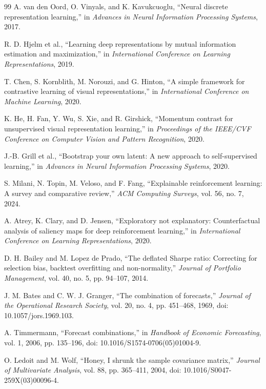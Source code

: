 \documentclass[11pt,a4paper]{article}
\begin{document}
\begin{thebibliography}{99}
A. van den Oord, O. Vinyals, and K. Kavukcuoglu,
``Neural discrete representation learning,'' in \emph{Advances in Neural Information Processing Systems}, 2017.

R. D. Hjelm et al.,
``Learning deep representations by mutual information estimation and maximization,'' in \emph{International Conference on Learning Representations}, 2019.

T. Chen, S. Kornblith, M. Norouzi, and G. Hinton,
``A simple framework for contrastive learning of visual representations,'' in \emph{International Conference on Machine Learning}, 2020.

K. He, H. Fan, Y. Wu, S. Xie, and R. Girshick,
``Momentum contrast for unsupervised visual representation learning,'' in \emph{Proceedings of the IEEE/CVF Conference on Computer Vision and Pattern Recognition}, 2020.

J.-B. Grill et al.,
``Bootstrap your own latent: A new approach to self-supervised learning,'' in \emph{Advances in Neural Information Processing Systems}, 2020.

S. Milani, N. Topin, M. Veloso, and F. Fang,
``Explainable reinforcement learning: A survey and comparative review,'' \emph{ACM Computing Surveys}, vol. 56, no. 7, 2024.

A. Atrey, K. Clary, and D. Jensen,
``Exploratory not explanatory: Counterfactual analysis of saliency maps for deep reinforcement learning,'' in \emph{International Conference on Learning Representations}, 2020.

D. H. Bailey and M. Lopez de Prado,
``The deflated Sharpe ratio: Correcting for selection bias, backtest overfitting and non-normality,'' \emph{Journal of Portfolio Management}, vol. 40, no. 5, pp. 94--107, 2014.

J. M. Bates and C. W. J. Granger,
``The combination of forecasts,'' \emph{Journal of the Operational Research Society}, vol. 20, no. 4, pp. 451--468, 1969, doi: 10.1057/jors.1969.103.

A. Timmermann,
``Forecast combinations,'' in \emph{Handbook of Economic Forecasting}, vol. 1, 2006, pp. 135--196, doi: 10.1016/S1574-0706(05)01004-9.

O. Ledoit and M. Wolf,
``Honey, I shrunk the sample covariance matrix,'' \emph{Journal of Multivariate Analysis}, vol. 88, pp. 365--411, 2004, doi: 10.1016/S0047-259X(03)00096-4.


\end{thebibliography}
\end{document}
